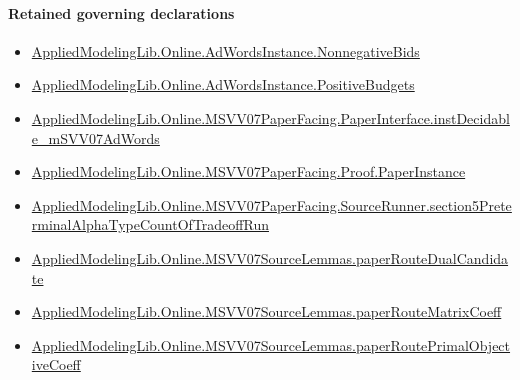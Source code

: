 \documentclass[10pt]{article}
\begin{document}
\paragraph{Retained governing declarations}
\begin{itemize}\raggedright
\item \hyperlink{governing-declaration-7bed8c5ff5e5cde7}{Applied\allowbreak{}Modeling\allowbreak{}Lib.\allowbreak{}Online.\allowbreak{}Ad\allowbreak{}Words\allowbreak{}Instance.\allowbreak{}Nonnegative\allowbreak{}Bids}
\item \hyperlink{governing-declaration-eabdcef9dca00922}{Applied\allowbreak{}Modeling\allowbreak{}Lib.\allowbreak{}Online.\allowbreak{}Ad\allowbreak{}Words\allowbreak{}Instance.\allowbreak{}Positive\allowbreak{}Budgets}
\item \hyperlink{governing-declaration-db9e33d2c816fc88}{Applied\allowbreak{}Modeling\allowbreak{}Lib.\allowbreak{}Online.\allowbreak{}MSVV07\allowbreak{}Paper\allowbreak{}Facing.\allowbreak{}Paper\allowbreak{}Interface.\allowbreak{}inst\allowbreak{}Decidable\_\allowbreak{}m\allowbreak{}SVV07\allowbreak{}Ad\allowbreak{}Words}
\item \hyperlink{governing-declaration-3117431b6d1253dc}{Applied\allowbreak{}Modeling\allowbreak{}Lib.\allowbreak{}Online.\allowbreak{}MSVV07\allowbreak{}Paper\allowbreak{}Facing.\allowbreak{}Proof.\allowbreak{}Paper\allowbreak{}Instance}
\item \hyperlink{paper-prerequisite-721f252b2952e397}{Applied\allowbreak{}Modeling\allowbreak{}Lib.\allowbreak{}Online.\allowbreak{}MSVV07\allowbreak{}Paper\allowbreak{}Facing.\allowbreak{}Source\allowbreak{}Runner.\allowbreak{}section5\allowbreak{}Preterminal\allowbreak{}Alpha\allowbreak{}Type\allowbreak{}Count\allowbreak{}Of\allowbreak{}Tradeoff\allowbreak{}Run}
\item \hyperlink{governing-declaration-ea9ef2b91c12f484}{Applied\allowbreak{}Modeling\allowbreak{}Lib.\allowbreak{}Online.\allowbreak{}MSVV07\allowbreak{}Source\allowbreak{}Lemmas.\allowbreak{}paper\allowbreak{}Route\allowbreak{}Dual\allowbreak{}Candidate}
\item \hyperlink{governing-declaration-961605a70d70a157}{Applied\allowbreak{}Modeling\allowbreak{}Lib.\allowbreak{}Online.\allowbreak{}MSVV07\allowbreak{}Source\allowbreak{}Lemmas.\allowbreak{}paper\allowbreak{}Route\allowbreak{}Matrix\allowbreak{}Coeff}
\item \hyperlink{governing-declaration-1dbae2694b160f0d}{Applied\allowbreak{}Modeling\allowbreak{}Lib.\allowbreak{}Online.\allowbreak{}MSVV07\allowbreak{}Source\allowbreak{}Lemmas.\allowbreak{}paper\allowbreak{}Route\allowbreak{}Primal\allowbreak{}Objective\allowbreak{}Coeff}

\end{itemize}
\end{document}
